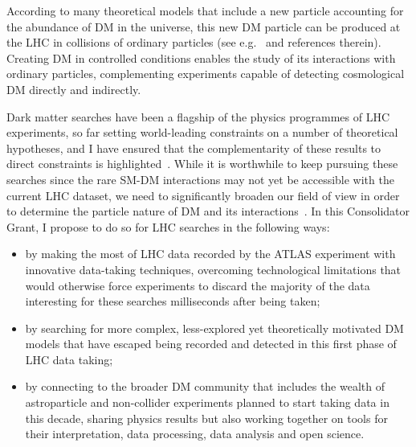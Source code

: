 \documentclass[11pt,a4paper]{article}
\begin{document}

According to many theoretical models that include a new particle accounting for the abundance of DM in the universe, this new DM particle can be produced at the LHC in collisions of ordinary particles (see e.g.~\cite{Boveia:2018yeb} and references therein). 
Creating DM in controlled conditions enables the study of its interactions with ordinary particles, complementing experiments capable of detecting cosmological DM directly and indirectly. %

Dark matter searches have been a flagship of the physics programmes of LHC experiments, so far setting world-leading constraints on a number of theoretical hypotheses, and I have ensured that the complementarity of these results to direct constraints is highlighted~\cite{DMWG}. While it is worthwhile to keep pursuing these searches since the rare SM-DM interactions may not yet be accessible with the current LHC dataset, we need to significantly broaden our field of view in order to determine the particle nature of DM and its interactions~\cite{Bertone:2018xtm}. In this Consolidator Grant, I propose to do so for LHC searches in the following ways:

\begin{itemize}
	\item by making the most of LHC data recorded by the ATLAS experiment with innovative data-taking techniques, overcoming technological limitations that would otherwise force experiments to discard the majority of the data interesting for these searches milliseconds after being taken;
	\item by searching for more complex, less-explored yet theoretically motivated DM models that have escaped being recorded and detected in this first phase of LHC data taking;
	\item by connecting to the broader DM community that includes the wealth of astroparticle and non-collider experiments planned to start taking data in this decade, sharing physics results but also working together on tools for their interpretation, data processing, data analysis and open science. 
\end{itemize}

\end{document}
